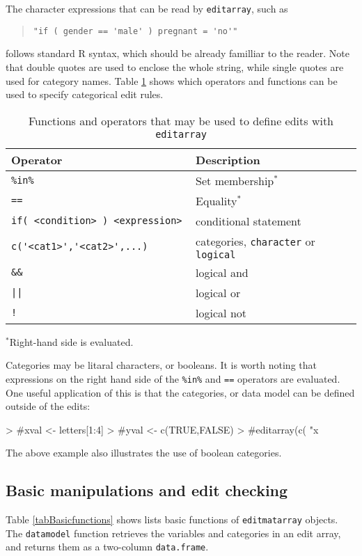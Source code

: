 \documentclass[11pt, fleqn, a4paper]{article}
\begin{document}
The character expressions that can be read by {\tt editarray}, such as
\begin{quote}
\verb+"if ( gender == 'male' ) pregnant = 'no'"+ 
\end{quote}
follows standard {\sf R} syntax, which should be already familliar to the
reader. Note that double quotes are used to enclose the whole string, while
single quotes are used for category names. Table \ref{tabOperators} shows
which operators and functions can be used to specify categorical edit rules.
%
\begin{table}
\begin{threeparttable}
\caption{Functions and operators that may be used to define edits with {\tt editarray} }
\label{tabOperators}
\begin{tabular}{ll}
\hline
Operator & Description\\
\hline
{\tt \%in\%} & Set membership$^*$  \\
{\tt ==}     & Equality$^*$ \\
{\tt if( <condition> ) <expression> } & conditional statement\\
{\tt c(\verb"'"<cat1>\verb"'",\verb"'"<cat2>\verb"'",...)} & categories, {\tt character} or {\tt logical}\\
{\tt \&\&}    & logical {\sc and}\\
{\tt ||}      & logical {\sc or}\\
{\tt !}       & logical {\sc not}\\
\hline
\end{tabular}
$^*${\small Right-hand side is evaluated.}
\end{threeparttable}
\end{table}
%
%
Categories may be litaral characters, or booleans.  It is worth noting that
expressions on the right hand side of the {\tt \%in\%}  and {\tt ==} operators
are evaluated. One useful application of this is that the categories, or data
model can be defined outside of the edits:
%
\begin{Schunk}
\begin{Sinput}
> #xval <- letters[1:4]
> #yval <- c(TRUE,FALSE)
> #editarray(c( "x %in% xval","y %in% yval","if ( x %in% c('a','b') ) !y "))
\end{Sinput}
\end{Schunk}
%
The above example also illustrates the use of boolean categories.



\subsection{Basic manipulations and edit checking}
Table \ref{tabBasicfunctions} shows lists basic functions of {\tt editmatarray}
objects.  The {\tt datamodel} function retrieves the variables and categories
in an edit array, and returns them as a two-column {\tt data.frame}.
\end{document}
